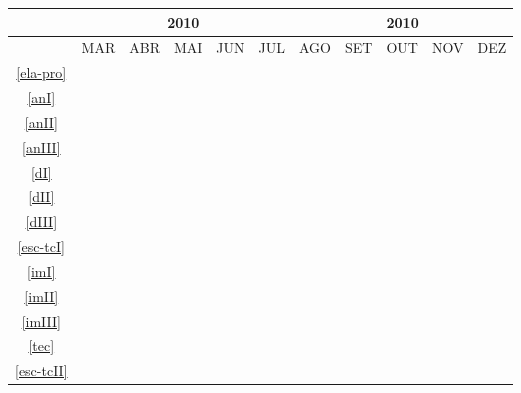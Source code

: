 \begin{table}[!htbp]
	\centering
		\begin{tabular}{|c|c|c|c|c|c|c|c|c|c|c|}
		\hline
		&\multicolumn{5}{c|}{2010}&\multicolumn{5}{c|}{2010}\\
		\hline
		&MAR&ABR&MAI&JUN&JUL&AGO&SET&OUT&NOV&DEZ\\
		\hline
		\ref{ela-pro}&\cellcolor{midgray}&&&&&&&&&\\
		\hline
		\ref{anI}&&\cellcolor{midgray}&&&&&&&&\\
		\hline	
		\ref{anII}&&\cellcolor{midgray}&&&&&&&&\\
		\hline			
		\ref{anIII}&&\cellcolor{midgray}&\cellcolor{midgray}&&&&&&&\\
		\hline	
		\ref{dI}&&&\cellcolor{midgray}&&&&&&&\\
		\hline
		\ref{dII}&&&\cellcolor{midgray}&\cellcolor{midgray}&&&&&&\\
		\hline	
		\ref{dIII}&&&&\cellcolor{midgray}&\cellcolor{midgray}&&&&&\\
		\hline	
		\ref{esc-tcI}&&&\cellcolor{midgray}&\cellcolor{midgray}&\cellcolor{midgray}&&&&&\\
		\hline	
		\ref{imI}&&&&&\cellcolor{midgray}&&&&&\\
		\hline	
		\ref{imII}&&&&&&\cellcolor{midgray}&&&&\\
		\hline	
		\ref{imIII}&&&&&&\cellcolor{midgray}&\cellcolor{midgray}&\cellcolor{midgray}&&\\
		\hline	
		\ref{tec}&&&&&&&&\cellcolor{midgray}&\cellcolor{midgray}&\\
		\hline	
		\ref{esc-tcII}&&&&&&&&\cellcolor{midgray}&\cellcolor{midgray}&\cellcolor{midgray}\\
		\hline	
		\end{tabular}
\end{table}

